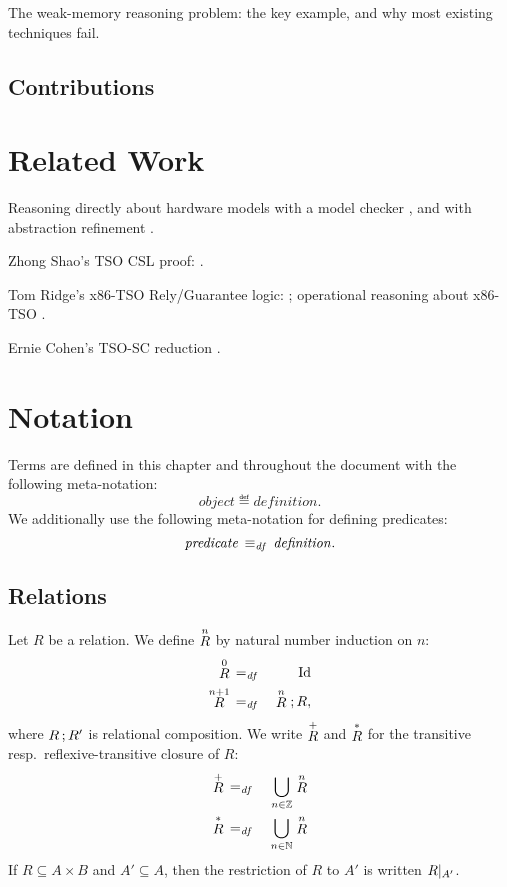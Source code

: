 \documentclass[11pt]{report}
\begin{document}
The weak-memory reasoning problem: the key example, and why most existing techniques fail. 



\section{Contributions} %
\label{sec:contributions}




\chapter{Related Work} %
\label{cha:related_work}

Reasoning directly about hardware models with a model checker \cite{DPN93}, and with abstraction refinement \cite{ChatterjeeDissertation}. 

Zhong Shao's TSO CSL proof: \cite{DBLP:conf/esop/FerreiraFS10}.

Tom Ridge's x86-TSO Rely/Guarantee logic: \cite{DBLP:conf/vstte/Ridge10}; operational reasoning about x86-TSO \cite{DBLP:conf/tphol/Ridge07}.

Ernie Cohen's TSO-SC reduction \cite{DBLP:conf/itp/CohenS10}. 


\chapter{Notation} %
\label{ch:notation}

Terms are defined in this chapter and throughout the document with the following meta-notation: \[ \mathit{object} \eqdef \mathit{definition}.\] We additionally use the following meta-notation for defining predicates: \[ \mathit{predicate} \iffdef \mathit{definition}.\]

\section{Relations} %
\label{sec:relations}

Let $R$ be a relation. We define $\relexp{R}{n}$ by natural number induction on $n$: \begin{eqnarray*}
	\relexp{R}{0} & \eqdef & \mathrm{Id} \\
	\relexp{R}{n + 1} & \eqdef & \relexp{R}{n} \seq R,
\end{eqnarray*} where $R \seq R'$ is relational composition. We write $\tcl{R}$ and $\rtcl{R}$ for the transitive resp.~reflexive-transitive closure of $R$: \begin{eqnarray*}
	\tcl{R} & \eqdef & \bigcup_{n \in \setintegers} \relexp{R}{n} \\
	\rtcl{R} & \eqdef & \bigcup_{n \in \setnaturals} \relexp{R}{n} 
\end{eqnarray*} If $R \subseteq A \times B$ and $A' \subseteq A$, then the restriction of $R$ to $A'$ is written $\restrict{R}{A'}$.
\end{document}
